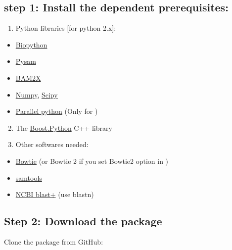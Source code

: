 \documentclass[letterpaper,10pt,english]{sphinxmanual}
\begin{document}
\subsection{step 1: Install the dependent prerequisites:}
\label{RNA-Hi-C-tools:step-1-install-the-dependent-prerequisites}\begin{enumerate}
\item {} 
Python libraries {[}for python 2.x{]}:

\end{enumerate}
\begin{itemize}
\item {} 
\href{http://biopython.org/wiki/Main\_Page}{Biopython}

\item {} 
\href{https://code.google.com/p/pysam/}{Pysam}

\item {} 
\href{http://bam2xwiki.appspot.com/Welcome}{BAM2X}

\item {} 
\href{http://www.numpy.org/}{Numpy}, \href{http://www.scipy.org/scipylib/index.html}{Scipy}

\item {} 
\href{http://www.parallelpython.com/}{Parallel python} (Only for )

\end{itemize}
\begin{enumerate}
\setcounter{enumi}{1}
\item {} 
The \href{http://www.boost.org/doc/libs/1\_54\_0/libs/python/doc/index.html}{Boost.Python} C++ library

\item {} 
Other softwares needed:

\end{enumerate}
\begin{itemize}
\item {} 
\href{http://bowtie-bio.sourceforge.net/index.shtml}{Bowtie} (or Bowtie 2 if you set Bowtie2 option in )

\item {} 
\href{http://samtools.sourceforge.net/}{samtools}

\item {} 
\href{ftp://ftp.ncbi.nlm.nih.gov/blast/executables/blast+/LATEST/}{NCBI blast+} (use blastn)

\end{itemize}


\subsection{Step 2: Download the package}
\label{RNA-Hi-C-tools:step-2-download-the-package}
Clone the package from GitHub:
\end{document}
